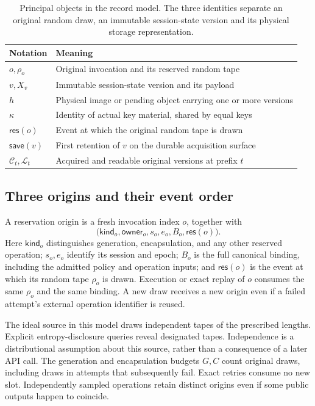 \begin{table}[t]
\centering
\caption{Principal objects in the record model. The three identities separate
an original random draw, an immutable session-state version and its physical
storage representation.}
\label{tab:record-notation}
\small
\begin{tabularx}{\linewidth}{@{}>{\raggedright\arraybackslash}p{.25\linewidth}X@{}}
\toprule
Notation & Meaning\\
\midrule
$o,\rho_o$ & Original invocation and its reserved random tape\\
$v,X_v$ & Immutable session-state version and its payload\\
$h$ & Physical image or pending object carrying one or more versions\\
$\kappa$ & Identity of actual key material, shared by equal keys\\
$\mathsf{res}(o)$ & Event at which the original random tape is drawn\\
$\mathsf{save}(v)$ & First retention of $v$ on the durable acquisition surface\\
$\mathcal C_t,\mathcal L_t$ & Acquired and readable original versions at prefix $t$\\
\bottomrule
\end{tabularx}
\end{table}

\subsection{Three origins and their event order}

\begin{definition}
\label{def:reservation-origin}
A reservation origin is a fresh invocation index $o$, together with
\[
  \bigl(\mathsf{kind}_o,\mathsf{owner}_o,s_o,e_o,B_o,
        \mathsf{res}(o)\bigr).
\]
Here $\mathsf{kind}_o$ distinguishes generation, encapsulation, and any other
reserved operation; $s_o,e_o$ identify its session and epoch; $B_o$ is the full
canonical binding, including the admitted policy and operation inputs; and
$\mathsf{res}(o)$ is the event at which its random tape $\rho_o$ is drawn.
Execution or exact replay of $o$ consumes the same $\rho_o$ and the same
binding.  A new draw receives a new origin even if a failed attempt's external
operation identifier is reused.
\end{definition}

The ideal source in this model draws independent tapes of the prescribed
lengths.  Explicit entropy-disclosure queries reveal designated tapes.
Independence is a distributional assumption about this source, rather than a
consequence of a later API call.  The generation and encapsulation budgets
$G,C$ count original draws, including draws in attempts that subsequently
fail.  Exact retries consume no new slot.  Independently sampled operations
retain distinct origins even if some public outputs happen to coincide.

